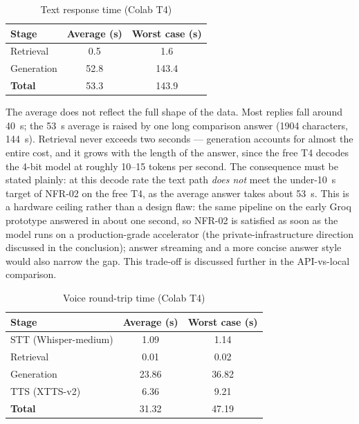 \documentclass[12pt, a4paper]{report}
\newcommand{\humantext}[1]{#1}      %
\newcommand{\latTxtRetAvg}{0.5}\newcommand{\latTxtRetWorst}{1.6}
\newcommand{\latTxtGenAvg}{52.8}\newcommand{\latTxtGenWorst}{143.4}
\newcommand{\latTxtTotAvg}{53.3}\newcommand{\latTxtTotWorst}{143.9}
\newcommand{\latVoiSttAvg}{1.09}\newcommand{\latVoiSttWorst}{1.14}
\newcommand{\latVoiRetAvg}{0.01}\newcommand{\latVoiRetWorst}{0.02}
\newcommand{\latVoiGenAvg}{23.86}\newcommand{\latVoiGenWorst}{36.82}
\newcommand{\latVoiTtsAvg}{6.36}\newcommand{\latVoiTtsWorst}{9.21}
\newcommand{\latVoiTotAvg}{31.32}\newcommand{\latVoiTotWorst}{47.19}
\begin{document}
\begin{table}[H]
\centering
\caption{Text response time (Colab T4)}
\label{tab:lat_text}
\begin{tabularx}{\textwidth}{X c c}
\toprule
\textbf{Stage} & \textbf{Average (s)} & \textbf{Worst case (s)} \\
\midrule
Retrieval   & \latTxtRetAvg  & \latTxtRetWorst \\
Generation  & \latTxtGenAvg  & \latTxtGenWorst \\
\textbf{Total} & \latTxtTotAvg & \latTxtTotWorst \\
\bottomrule
\end{tabularx}
\end{table}

\humantext{The average does not reflect the full shape of the data. Most replies fall around 40~s; the 53~s average is raised by one long comparison answer (1904 characters, 144~s). Retrieval never exceeds two seconds --- generation accounts for almost the entire cost, and it grows with the length of the answer, since the free T4 decodes the 4-bit model at roughly 10--15 tokens per second. The consequence must be stated plainly: at this decode rate the text path \emph{does not} meet the under-10~s target of NFR-02 on the free T4, as the average answer takes about 53~s. This is a hardware ceiling rather than a design flaw: the same pipeline on the early Groq prototype answered in about one second, so NFR-02 is satisfied as soon as the model runs on a production-grade accelerator (the private-infrastructure direction discussed in the conclusion); answer streaming and a more concise answer style would also narrow the gap. This trade-off is discussed further in the API-vs-local comparison.}

\begin{table}[H]
\centering
\caption{Voice round-trip time (Colab T4)}
\label{tab:lat_voice}
\begin{tabularx}{\textwidth}{X c c}
\toprule
\textbf{Stage} & \textbf{Average (s)} & \textbf{Worst case (s)} \\
\midrule
STT (Whisper-medium) & \latVoiSttAvg & \latVoiSttWorst \\
Retrieval            & \latVoiRetAvg & \latVoiRetWorst \\
Generation           & \latVoiGenAvg & \latVoiGenWorst \\
TTS (XTTS-v2)         & \latVoiTtsAvg & \latVoiTtsWorst \\
\textbf{Total}        & \latVoiTotAvg & \latVoiTotWorst \\
\bottomrule
\end{tabularx}
\end{table}
\end{document}

